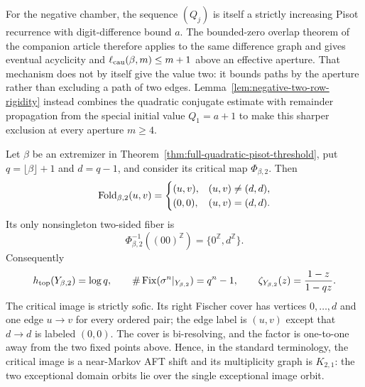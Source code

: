 For the negative chamber, the sequence $(Q_j)$ is itself a strictly
increasing Pisot recurrence with digit-difference bound $a$.  The bounded-zero
overlap theorem of the companion article
therefore applies to the same difference graph and gives eventual acyclicity
and $\ell_{\rm cau}(\beta,m)\le m+1$ above an effective aperture.  That
mechanism does not by itself give the value two: it bounds paths by the
aperture rather than excluding a path of two edges.
Lemma~\ref{lem:negative-two-row-rigidity} instead combines the quadratic
conjugate estimate with remainder propagation from the special initial value
$Q_1=a+1$ to make this sharper exclusion at every aperture $m\ge4$.

\begin{theorem}
\label{thm:quadratic-critical-normal-form}
Let $\beta$ be an extremizer in
Theorem~\ref{thm:full-quadratic-pisot-threshold}, put
$q=\lfloor\beta\rfloor+1$ and $d=q-1$, and consider its critical map
$\Phi_{\beta,2}$.  Then
\[
\mathrm{Fold}_{\beta,2}(u,v)=
\begin{cases}
(u,v),&(u,v)\ne(d,d),\\
(0,0),&(u,v)=(d,d).
\end{cases}
\]
Its only nonsingleton two-sided fiber is
\[
\Phi_{\beta,2}^{-1}((00)^{\mathbb Z})
=\{0^{\mathbb Z},d^{\mathbb Z}\}.
\]
Consequently
\[
h_{\rm top}(Y_{\beta,2})=\log q,
\qquad
\#\operatorname{Fix}(\sigma^n|_{Y_{\beta,2}})=q^n-1,
\qquad
\zeta_{Y_{\beta,2}}(z)=\frac{1-z}{1-qz}.
\]
The critical image is strictly sofic.  Its right Fischer cover has vertices
$0,\ldots,d$ and one edge $u\to v$ for every ordered pair; the edge label is
$(u,v)$ except that $d\to d$ is labeled $(0,0)$.  The cover is bi-resolving,
and the factor is one-to-one away from the two fixed points above.  Hence, in
the standard terminology, the critical image is a near-Markov AFT shift and
its multiplicity graph is $K_{2,1}$: the two exceptional domain orbits lie
over the single exceptional image orbit.
\end{theorem}

